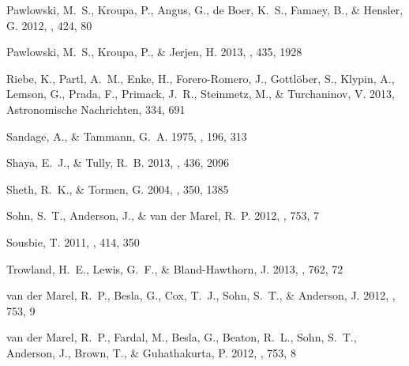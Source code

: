 \documentclass{emulateapj}
\begin{document}
\begin{thebibliography}{48}
{Pawlowski}, M.~S., {Kroupa}, P., {Angus}, G., {de Boer}, K.~S., {Famaey}, B.,
  \& {Hensler}, G. 2012, \mnras, 424, 80

{Pawlowski}, M.~S., {Kroupa}, P., \& {Jerjen}, H. 2013, \mnras, 435, 1928

{Riebe}, K., {Partl}, A.~M., {Enke}, H., {Forero-Romero}, J., {Gottl{\"o}ber},
  S., {Klypin}, A., {Lemson}, G., {Prada}, F., {Primack}, J.~R., {Steinmetz},
  M., \& {Turchaninov}, V. 2013, Astronomische Nachrichten, 334, 691

{Sandage}, A., \& {Tammann}, G.~A. 1975, \apj, 196, 313

{Shaya}, E.~J., \& {Tully}, R.~B. 2013, \mnras, 436, 2096

{Sheth}, R.~K., \& {Tormen}, G. 2004, \mnras, 350, 1385

{Sohn}, S.~T., {Anderson}, J., \& {van der Marel}, R.~P. 2012, \apj, 753, 7

{Sousbie}, T. 2011, \mnras, 414, 350

{Trowland}, H.~E., {Lewis}, G.~F., \& {Bland-Hawthorn}, J. 2013, \apj, 762, 72

{van der Marel}, R.~P., {Besla}, G., {Cox}, T.~J., {Sohn}, S.~T., \&
  {Anderson}, J. 2012{}, \apj, 753, 9

{van der Marel}, R.~P., {Fardal}, M., {Besla}, G., {Beaton}, R.~L., {Sohn},
  S.~T., {Anderson}, J., {Brown}, T., \& {Guhathakurta}, P. 2012{},
  \apj, 753, 8


\end{thebibliography}
\end{document}
